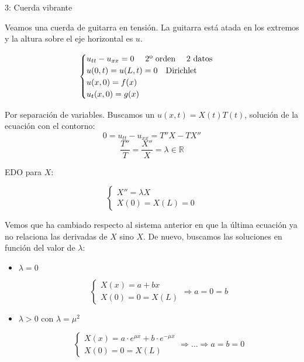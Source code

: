 		\begin{example}{3: Cuerda vibrante}

			Veamos una cuerda de guitarra en tensión. La guitarra está atada en los extremos y la altura sobre el eje horizontal es $u$.

			\begin{figure}[thbp]
			\centering
			\caption{}
			\label{fig:cuerdaGuitarra}
			\end{figure}


			\[  \begin{cases}
				u_{tt} - u_{xx} = 0 \quad \text{ 2º orden \quad 2 datos } \\
				u(0,t) = u(L,t) = 0 \quad \text{Dirichlet}\\
				u(x,0) = f(x) \\
				u_t(x,0) = g(x)
				\end{cases}
			\]

			Por separación de variables. Buscamos un $u(x,t) = X(t) T(t)$, solución de la ecuación con el contorno:
			\[ 0 = u_{tt} - u_{xx} = T'' X - T X''\]
			\[ \frac{T''}{T} = \frac{X''}{X} = \lambda \in \mathbb{R}\]

			EDO para $X$:

			\[\begin{cases}
				X'' = \lambda X \\
				X(0) = X(L) = 0
			\end{cases}
			\]

			Vemos que ha cambiado respecto al sistema anterior en que la última ecuación ya no relaciona las derivadas de $X$ sino $X$. De nuevo, buscamos las soluciones en función del valor de $\lambda$:

			\begin{itemize}
				\item $\lambda = 0$

					\[
					\left\{
					\begin{array}{l}
					X(x) = a + bx \\
					X(0) = 0 = X(L)
					\end{array}
					\right.
					\Rightarrow
					a = 0 = b
					\]

				\item $\lambda > 0$ con $\lambda = \mu^2$

					\[
					\left\{
					\begin{array}{l}
					X(x) = a \cdot e^{\mu x} + b \cdot e^{-\mu x} \\
					X(0) = 0 = X(L)
					\end{array}
					\right.
					\Rightarrow … \Rightarrow
					a = b = 0
					\]


\end{itemize}
\end{example}
